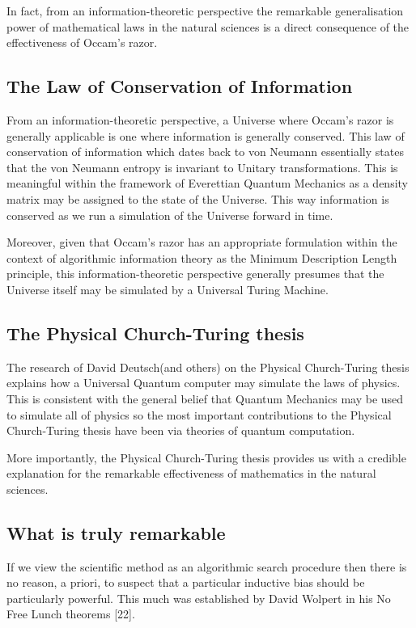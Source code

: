 \documentclass{article}
\begin{document}
In fact, from an information-theoretic perspective the remarkable generalisation power of mathematical laws in the natural
sciences is a direct consequence of the effectiveness of Occam's razor.

\subsection{The Law of Conservation of Information}

From an information-theoretic perspective, a Universe where Occam's razor is generally applicable is one where information
is generally conserved. This law of conservation of information which dates back to von Neumann essentially states that the
von Neumann entropy is invariant to Unitary transformations. This is meaningful within the framework of Everettian Quantum
Mechanics as a density matrix may be assigned to the state of the Universe. This way information is conserved as we run a
simulation of the Universe forward in time.

Moreover, given that Occam's razor has an appropriate formulation within the context of algorithmic
information theory as the Minimum Description Length principle, this information-theoretic perspective generally presumes that the
Universe itself may be simulated by a Universal Turing Machine.

\subsection{The Physical Church-Turing thesis}

The research of David Deutsch(and others) on the Physical Church-Turing thesis explains how a Universal Quantum computer may simulate the laws of physics. This is consistent with the general belief that Quantum Mechanics may be used to simulate all
of physics so the most important contributions to the Physical Church-Turing thesis have been via theories of quantum computation.

More importantly, the Physical Church-Turing thesis provides us with a credible explanation for the remarkable effectiveness of
mathematics in the natural sciences.

\subsection{What is truly remarkable}

If we view the scientific method as an algorithmic search procedure then there is no reason, a priori, to suspect that a particular inductive bias should be particularly powerful. This much was established by David Wolpert in his No Free Lunch
theorems [22].
\end{document}
